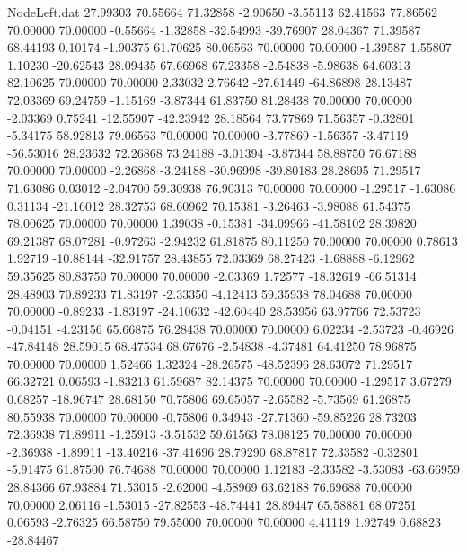 \begin{filecontents}{NodeLeft.dat}
  27.99303   70.55664   71.32858    -2.90650   -3.55113   62.41563   77.86562   70.00000   70.00000   -0.55664   -1.32858  -32.54993  -39.76907
  28.04367   71.39587   68.44193     0.10174   -1.90375   61.70625   80.06563   70.00000   70.00000   -1.39587    1.55807    1.10230  -20.62543
  28.09435   67.66968   67.23358    -2.54838   -5.98638   64.60313   82.10625   70.00000   70.00000    2.33032    2.76642  -27.61449  -64.86898
  28.13487   72.03369   69.24759    -1.15169   -3.87344   61.83750   81.28438   70.00000   70.00000   -2.03369    0.75241  -12.55907  -42.23942
  28.18564   73.77869   71.56357    -0.32801   -5.34175   58.92813   79.06563   70.00000   70.00000   -3.77869   -1.56357   -3.47119  -56.53016
  28.23632   72.26868   73.24188    -3.01394   -3.87344   58.88750   76.67188   70.00000   70.00000   -2.26868   -3.24188  -30.96998  -39.80183
  28.28695   71.29517   71.63086     0.03012   -2.04700   59.30938   76.90313   70.00000   70.00000   -1.29517   -1.63086    0.31134  -21.16012
  28.32753   68.60962   70.15381    -3.26463   -3.98088   61.54375   78.00625   70.00000   70.00000    1.39038   -0.15381  -34.09966  -41.58102
  28.39820   69.21387   68.07281    -0.97263   -2.94232   61.81875   80.11250   70.00000   70.00000    0.78613    1.92719  -10.88144  -32.91757
  28.43855   72.03369   68.27423    -1.68888   -6.12962   59.35625   80.83750   70.00000   70.00000   -2.03369    1.72577  -18.32619  -66.51314
  28.48903   70.89233   71.83197    -2.33350   -4.12413   59.35938   78.04688   70.00000   70.00000   -0.89233   -1.83197  -24.10632  -42.60440
  28.53956   63.97766   72.53723    -0.04151   -4.23156   65.66875   76.28438   70.00000   70.00000    6.02234   -2.53723   -0.46926  -47.84148
  28.59015   68.47534   68.67676    -2.54838   -4.37481   64.41250   78.96875   70.00000   70.00000    1.52466    1.32324  -28.26575  -48.52396
  28.63072   71.29517   66.32721     0.06593   -1.83213   61.59687   82.14375   70.00000   70.00000   -1.29517    3.67279    0.68257  -18.96747
  28.68150   70.75806   69.65057    -2.65582   -5.73569   61.26875   80.55938   70.00000   70.00000   -0.75806    0.34943  -27.71360  -59.85226
  28.73203   72.36938   71.89911    -1.25913   -3.51532   59.61563   78.08125   70.00000   70.00000   -2.36938   -1.89911  -13.40216  -37.41696
  28.79290   68.87817   72.33582    -0.32801   -5.91475   61.87500   76.74688   70.00000   70.00000    1.12183   -2.33582   -3.53083  -63.66959
  28.84366   67.93884   71.53015    -2.62000   -4.58969   63.62188   76.69688   70.00000   70.00000    2.06116   -1.53015  -27.82553  -48.74441
  28.89447   65.58881   68.07251     0.06593   -2.76325   66.58750   79.55000   70.00000   70.00000    4.41119    1.92749    0.68823  -28.84467

\end{filecontents}
